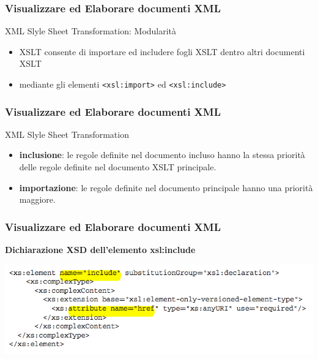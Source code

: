 \begin{frame}
    \frametitle{Visualizzare ed Elaborare documenti XML}
    \addtocounter{nframe}{1}

     \begin{block}{XML Slyle Sheet Transformation: Modularità}
        \begin{itemize}
            \item XSLT consente di importare ed includere fogli XSLT dentro altri documenti XSLT
            \item mediante gli elementi \texttt{<xsl:import>} ed \texttt{<xsl:include>} 
        \end{itemize}
     \end{block}

\end{frame}

\begin{frame}
    \frametitle{Visualizzare ed Elaborare documenti XML}
    \addtocounter{nframe}{1}

     \begin{block}{XML Slyle Sheet Transformation}
        \begin{itemize}
            \item \textbf{inclusione}: le regole definite nel documento incluso hanno la stessa priorità delle regole definite nel documento XSLT principale.
            \item \textbf{importazione}: le regole definite nel documento principale hanno una priorità maggiore.
        \end{itemize}

     \end{block}

\end{frame}


\begin{frame}
    \frametitle{Visualizzare ed Elaborare documenti XML}
    \addtocounter{nframe}{1}
    
    \textbf{Dichiarazione XSD dell'elemento xsl:include}

    \begin{center}
        \includegraphics[width=.95\textwidth]{imgs/elementXSL-Include.png}
    \end{center}

\end{frame}

